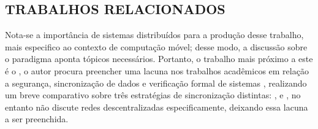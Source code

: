 \subsection{TRABALHOS RELACIONADOS}

Nota-se a importância de sistemas distribuídos para a produção desse trabalho, mais especifico ao contexto de computação móvel; desse modo, a discussão sobre o paradigma  aponta tópicos necessários. Portanto, o trabalho mais próximo a este é o  \cite{pothineni2024offlinefirst}, o autor procura preencher uma lacuna nos trabalhos acadêmicos em relação a segurança, sincronização de dados e verificação formal de sistemas , realizando um breve comparativo sobre três estratégias de sincronização distintas: ,  e , no entanto não discute redes descentralizadas especificamente, deixando essa lacuna a ser preenchida. 


